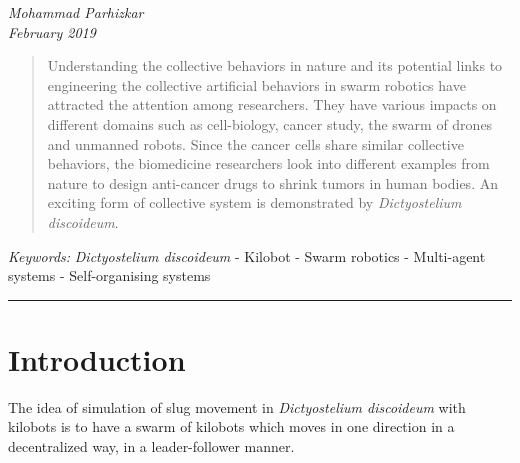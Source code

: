 \documentclass[11pt,a4paper]{article}
\begin{document}
\begin{center}
{ }
\vspace{2mm}

{\selectfont\textit{Mohammad Parhizkar \\ \small{February 2019} }}


\end{center}
\begin{abstract}
Understanding the collective behaviors in nature and its potential links to engineering the collective artificial behaviors in swarm robotics have attracted the attention among researchers. They have various impacts on different domains such as cell-biology, cancer study, the swarm of drones and unmanned robots. Since the cancer cells share similar collective behaviors, the biomedicine researchers look into different examples from nature to design anti-cancer drugs to shrink tumors in human bodies. An exciting form of collective system is demonstrated by {\textit{Dictyostelium discoideum}}. 

   \end{abstract}

{\footnotesize\textit{Keywords:} {\textit{Dictyostelium discoideum}} - Kilobot - Swarm robotics - Multi-agent systems - Self-organising systems}

{\begin{center}\noindent\rule{14cm}{0.4pt}\end{center}}
\section{Introduction}
The idea of simulation of slug movement in \textit{Dictyostelium discoideum} with kilobots is to have a swarm of kilobots which moves in one direction in a decentralized way, in a leader-follower manner.
\end{document}
